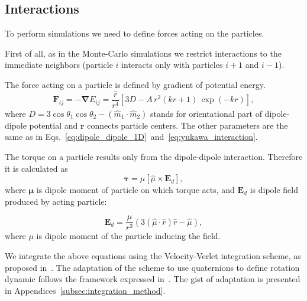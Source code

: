 \subsection{Interactions}

To perform simulations we need to define forces acting on the particles.

First of all, as in the Monte-Carlo simulations we restrict interactions to the immediate neighbors (particle $i$ interacts only with particles $i+1$ and $i-1$).

The force acting on a particle is defined by gradient of potential energy.
\begin{equation}
\label{eq:full_force}
	\boldsymbol{F}_{ij}
		= -\boldsymbol{\nabla} E_{ij}
		=  \frac{\hat{r}}{r^4} \left[3 D - A\, r^2 (k r +1) \, \exp(-k r) \right],
\end{equation}
where $D = 3 \cos \theta_1 \cos \theta_2 - (\hat{m}_1 \cdot \hat{m}_2)$ stands for orientational part of dipole-dipole potential and $\boldsymbol{r}$ connects particle centers. The other parameters are the same as in Eqs.~\eqref{eq:dipole_dipole_1D}~and~\eqref{eq:yukawa_interaction}.

The torque on a particle results only from the dipole-dipole interaction. Therefore it is calculated as
\begin{equation}
\label{eq:dipole_torque}
	\boldsymbol{\tau}  = \mu[\hat{\mu} \times \boldsymbol{E}_d ],
\end{equation}
where $\boldsymbol{\mu}$ is dipole moment of particle on which torque acts, and $\boldsymbol{E}_d$ is dipole field produced by acting particle:

\begin{equation}
\label{eq:dipole_field}
	\boldsymbol{E}_d = \frac{\mu}{r^3}
		\left(3 (\hat{\mu} \cdot \hat{r}) \hat{r} - \hat{\mu} \right),
\end{equation}
where $\mu$ is dipole moment of the particle inducing the field.

We integrate the above equations using the Velocity-Verlet integration scheme, as proposed in~\cite{Taylor2013}. The adaptation of the scheme to use quaternions to define rotation dynamic follows the framework expressed in~\cite{}. The gist of adaptation is presented in Appendices~\ref{subsec:integration_method}.


